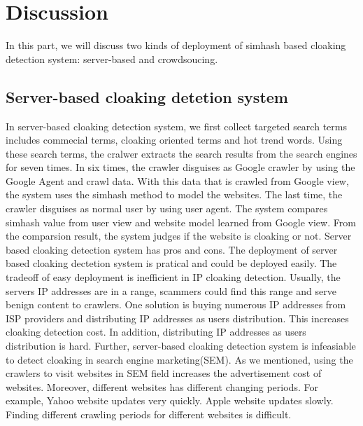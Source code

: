 \section{Discussion}
\label{s:discussion}

In this part, we will discuss two kinds of deployment of simhash based cloaking detection system: server-based and crowdsoucing.

\subsection{Server-based cloaking detetion system}
In server-based cloaking detection system,
we first collect targeted search terms includes commecial terms, cloaking oriented terms and hot trend words.
Using these search terms, the cralwer extracts the search results from the search engines for seven times.
In six times, the crawler disguises as Google crawler by using the Google Agent and crawl data. With this data that
is crawled from Google view, the system uses the simhash method to model the websites. The last
time, the crawler disguises as normal user by using user agent. The system compares simhash value from user view and
website model learned from Google view. From the comparsion result, the system judges if the website is cloaking
or not. 
Server based cloaking detection system has pros and cons. The deployment of server based cloaking dectetion system
is pratical and could be deployed
easily. The tradeoff of easy deployment is inefficient in IP cloaking detection. Usually, the servers IP addresses
are in a range,  scammers could find this range and serve benign content to crawlers. One solution is buying numerous IP addresses
from ISP providers and distributing IP addresses as users distribution. This increases cloaking detection cost. In
addition, distributing IP addresses as users distribution is hard. Further, server-based cloaking detection system is infeasiable
to detect cloaking in search engine marketing(SEM). As we mentioned, using the crawlers to visit websites in SEM field
increases the advertisement cost of websites. Moreover, different websites has different changing periods. For example, Yahoo website
updates very quickly. Apple website updates slowly. Finding different crawling periods for different websites is difficult. 

